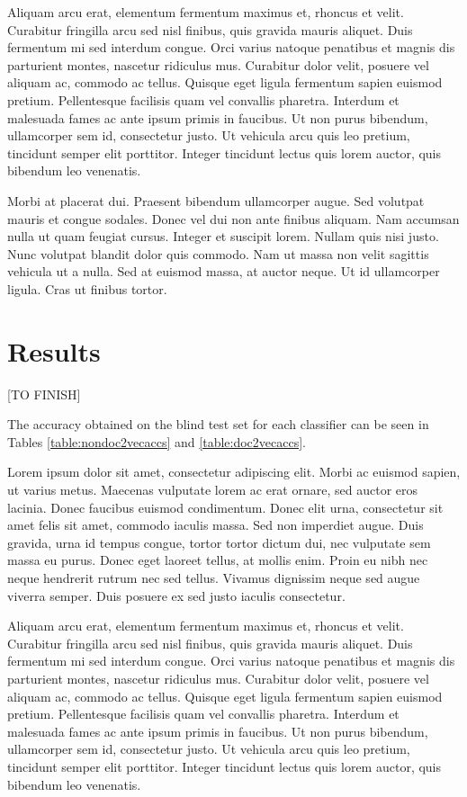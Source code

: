 \documentclass[twocolumn]{article}
\begin{document}
Aliquam arcu erat, elementum fermentum maximus et, rhoncus et velit. Curabitur fringilla arcu sed nisl finibus, quis gravida mauris aliquet. Duis fermentum mi sed interdum congue. Orci varius natoque penatibus et magnis dis parturient montes, nascetur ridiculus mus. Curabitur dolor velit, posuere vel aliquam ac, commodo ac tellus. Quisque eget ligula fermentum sapien euismod pretium. Pellentesque facilisis quam vel convallis pharetra. Interdum et malesuada fames ac ante ipsum primis in faucibus. Ut non purus bibendum, ullamcorper sem id, consectetur justo. Ut vehicula arcu quis leo pretium, tincidunt semper elit porttitor. Integer tincidunt lectus quis lorem auctor, quis bibendum leo venenatis.

Morbi at placerat dui. Praesent bibendum ullamcorper augue. Sed volutpat mauris et congue sodales. Donec vel dui non ante finibus aliquam. Nam accumsan nulla ut quam feugiat cursus. Integer et suscipit lorem. Nullam quis nisi justo. Nunc volutpat blandit dolor quis commodo. Nam ut massa non velit sagittis vehicula ut a nulla. Sed at euismod massa, at auctor neque. Ut id ullamcorper ligula. Cras ut finibus tortor.

\section{Results}

[TO FINISH]

The accuracy obtained on the blind test set for each classifier can be seen in Tables \ref{table:nondoc2vecaccs} and \ref{table:doc2vecaccs}.

Lorem ipsum dolor sit amet, consectetur adipiscing elit. Morbi ac euismod sapien, ut varius metus. Maecenas vulputate lorem ac erat ornare, sed auctor eros lacinia. Donec faucibus euismod condimentum. Donec elit urna, consectetur sit amet felis sit amet, commodo iaculis massa. Sed non imperdiet augue. Duis gravida, urna id tempus congue, tortor tortor dictum dui, nec vulputate sem massa eu purus. Donec eget laoreet tellus, at mollis enim. Proin eu nibh nec neque hendrerit rutrum nec sed tellus. Vivamus dignissim neque sed augue viverra semper. Duis posuere ex sed justo iaculis consectetur.

Aliquam arcu erat, elementum fermentum maximus et, rhoncus et velit. Curabitur fringilla arcu sed nisl finibus, quis gravida mauris aliquet. Duis fermentum mi sed interdum congue. Orci varius natoque penatibus et magnis dis parturient montes, nascetur ridiculus mus. Curabitur dolor velit, posuere vel aliquam ac, commodo ac tellus. Quisque eget ligula fermentum sapien euismod pretium. Pellentesque facilisis quam vel convallis pharetra. Interdum et malesuada fames ac ante ipsum primis in faucibus. Ut non purus bibendum, ullamcorper sem id, consectetur justo. Ut vehicula arcu quis leo pretium, tincidunt semper elit porttitor. Integer tincidunt lectus quis lorem auctor, quis bibendum leo venenatis.
\end{document}
